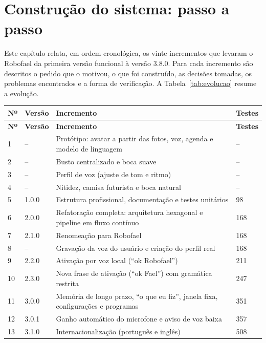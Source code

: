\chapter{Construção do sistema: passo a passo}

Este capítulo relata, em ordem cronológica, os vinte incrementos que levaram o Robofael da primeira
versão funcional à versão 3.8.0. Para cada incremento são descritos o pedido que o motivou, o que foi
construído, as decisões tomadas, os problemas encontrados e a forma de verificação. A
Tabela~\ref{tab:evolucao} resume a evolução.

\begin{singlespace}
\label{tab:evolucao}
\small
\begin{tabularx}{\textwidth}{C{0.8cm}C{1.6cm}LC{2.2cm}}
\toprule
\textbf{Nº} & \textbf{Versão} & \textbf{Incremento} & \textbf{Testes} \\ \midrule
\endfirsthead
\toprule
\textbf{Nº} & \textbf{Versão} & \textbf{Incremento} & \textbf{Testes} \\ \midrule
{}  & --     & Protótipo: avatar a partir das fotos, voz, agenda e modelo de linguagem & -- \\
2  & --     & Busto centralizado e boca suave & -- \\
3  & --     & Perfil de voz (ajuste de tom e ritmo) & -- \\
4  & --     & Nitidez, camisa futurista e boca natural & -- \\
5  & 1.0.0  & Estrutura profissional, documentação e testes unitários & 98 \\
6  & 2.0.0  & Refatoração completa: arquitetura hexagonal e pipeline em fluxo contínuo & 168 \\
7  & 2.1.0  & Renomeação para Robofael & 168 \\
8  & --     & Gravação da voz do usuário e criação do perfil real & 168 \\
9  & 2.2.0  & Ativação por voz local (“ok Robofael”) & 211 \\
10 & 2.3.0  & Nova frase de ativação (“ok Fael”) com gramática restrita & 247 \\
11 & 3.0.0  & Memória de longo prazo, “o que eu fiz”, janela fixa, configurações e programas & 351 \\
12 & 3.0.1  & Ganho automático do microfone e aviso de voz baixa & 357 \\
13 & 3.1.0  & Internacionalização (português e inglês) & 508 \\

\end{tabularx}
\end{singlespace}
